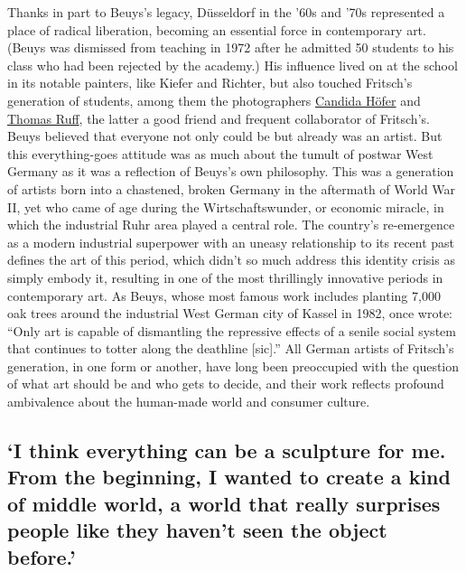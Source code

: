 Thanks in part to Beuys's legacy, Düsseldorf in the '60s and '70s
represented a place of radical liberation, becoming an essential force
in contemporary art. (Beuys was dismissed from teaching in 1972 after he
admitted 50 students to his class who had been rejected by the academy.)
His influence lived on at the school in its notable painters, like
Kiefer and Richter, but also touched Fritsch's generation of students,
among them the photographers
\href{https://www.nytimes3xbfgragh.onion/2015/05/29/magazine/candida-hofers-wide-open-spaces.html}{Candida
Höfer} and
\href{https://www.nytimes3xbfgragh.onion/2017/10/05/arts/design/thomas-ruff-whitechapel-gallery.html}{Thomas
Ruff}, the latter a good friend and frequent collaborator of Fritsch's.
Beuys believed that everyone not only could be but already was an
artist. But this everything-goes attitude was as much about the tumult
of postwar West Germany as it was a reflection of Beuys's own
philosophy. This was a generation of artists born into a chastened,
broken Germany in the aftermath of World War II, yet who came of age
during the Wirtschaftswunder, or economic miracle, in which the
industrial Ruhr area played a central role. The country's re-emergence
as a modern industrial superpower with an uneasy relationship to its
recent past defines the art of this period, which didn't so much address
this identity crisis as simply embody it, resulting in one of the most
thrillingly innovative periods in contemporary art. As Beuys, whose most
famous work includes planting 7,000 oak trees around the industrial West
German city of Kassel in 1982, once wrote: ``Only art is capable of
dismantling the repressive effects of a senile social system that
continues to totter along the deathline {[}sic{]}.'' All German artists
of Fritsch's generation, in one form or another, have long been
preoccupied with the question of what art should be and who gets to
decide, and their work reflects profound ambivalence about the
human-made world and consumer culture.

\hypertarget{i-think-everything-can-be-a-sculpture-for-me-from-the-beginning-i-wanted-to-create-a-kind-of-middle-world-a-world-that-really-surprises-people-like-they-havent-seen-the-object-before}{%
\subsection{`I think everything can be a sculpture for me. From the
beginning, I wanted to create a kind of middle world, a world that
really surprises people like they haven't seen the object
before.'}\label{i-think-everything-can-be-a-sculpture-for-me-from-the-beginning-i-wanted-to-create-a-kind-of-middle-world-a-world-that-really-surprises-people-like-they-havent-seen-the-object-before}}

